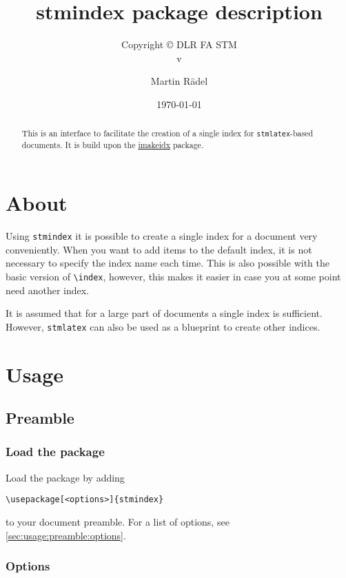 \documentclass{scrartcl}
\author{Martin R\"{a}del}
\title{stmindex package description}
\subtitle{Copyright \copyright{} \the\year{} DLR FA STM\\v\formatdate[versiondatestyle]{\DTMToday}}
\date{\today}
\begin{document}
\maketitle

\begin{abstract}
This is an interface to facilitate the creation of a single index for \texttt{stmlatex}-based documents. It is build upon the \href{https://ctan.org/pkg/imakeidx}{imakeidx} package.
\end{abstract}

\tableofcontents

\section{About}

Using \texttt{stmindex} it is possible to create a single index for a document very conveniently. When you want to add items to the default index, it is not necessary to specify the index name each time. This is also possible with the basic version of \verb+\index+, however, this makes it easier in case you at some point need another index.

It is assumed that for a large part of documents a single index is sufficient. However, \texttt{stmlatex} can also be used as a blueprint to create other indices.

\section{Usage}%

\subsection{Preamble}

\subsubsection{Load the package}

Load the package by adding

\begin{verbatim}
\usepackage[<options>]{stmindex}
\end{verbatim}

to your document preamble. For a list of options, see \autoref{sec:usage:preamble:options}.

\subsubsection{Options}
\label{sec:usage:preamble:options}
\end{document}
